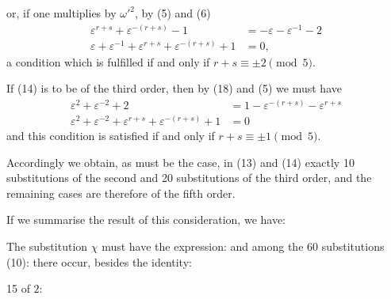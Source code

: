 or, if one multiplies by $\omega'^2$, by (5) and (6)
\[
\begin{aligned}
\varepsilon^{r+s} + \varepsilon^{-(r+s)} - 1 &= -\varepsilon - \varepsilon^{-1} - 2 \\
\varepsilon + \varepsilon^{-1} + \varepsilon^{r+s} + \varepsilon^{-(r+s)} + 1 &= 0,
\end{aligned}
\]
a condition which is fulfilled if and only if
$r + s \equiv \pm 2 \pmod{5}$.

If (14) is to be of the third order, then by
(18) and (5) we must have
\[
\begin{aligned}
\varepsilon^2 + \varepsilon^{-2} + 2 &= 1 - \varepsilon^{-(r+s)} - \varepsilon^{r+s} \\
\varepsilon^2 + \varepsilon^{-2} + \varepsilon^{r+s} + \varepsilon^{-(r+s)} + 1 &= 0
\end{aligned}
\]
and this condition is satisfied if and only if
$r + s \equiv \pm 1 \pmod{5}$.

Accordingly we obtain, as must be the case, in (13) and (14)
exactly 10 substitutions of the second and 20 substitutions of the third
order, and the remaining cases are therefore of the fifth order.

If we summarise the result of this consideration, we
have:

The substitution $\chi$ must have the expression:
and among the 60 substitutions (10):
there occur, besides the identity:

15  of  $2$:

